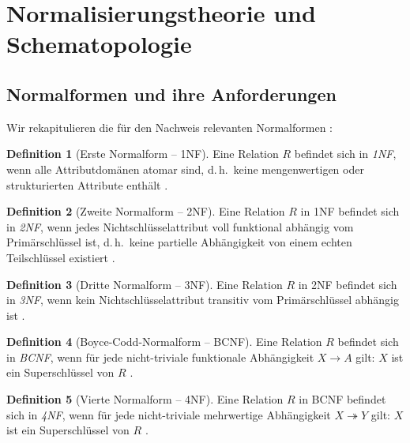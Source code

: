 ﻿\documentclass[a4paper,12pt]{report}
\theoremstyle{definition}
\newtheorem{definition}{Definition}[chapter]
\theoremstyle{remark}
\begin{document}
\section{Normalisierungstheorie und Schematopologie}
\label{sec:normalformen}

\subsection{Normalformen und ihre Anforderungen}

Wir rekapitulieren die für den Nachweis relevanten Normalformen \cite{Codd1974, Fagin1977}:

\begin{definition}[Erste Normalform -- 1NF]
Eine Relation $R$ befindet sich in \emph{1NF}, wenn alle Attributdomänen
atomar sind, d.\,h.\ keine mengenwertigen oder strukturierten Attribute
enthält \cite{Codd1970}.
\end{definition}

\begin{definition}[Zweite Normalform -- 2NF]
Eine Relation $R$ in 1NF befindet sich in \emph{2NF}, wenn jedes
Nichtschlüsselattribut voll funktional abhängig vom Primärschlüssel ist,
d.\,h.\ keine partielle Abhängigkeit von einem echten Teilschlüssel existiert
\cite{Codd1974}.
\end{definition}

\begin{definition}[Dritte Normalform -- 3NF]
Eine Relation $R$ in 2NF befindet sich in \emph{3NF}, wenn kein
Nichtschlüsselattribut transitiv vom Primärschlüssel abhängig ist
\cite{Codd1974}.
\end{definition}

\begin{definition}[Boyce-Codd-Normalform -- BCNF]
Eine Relation $R$ befindet sich in \emph{BCNF}, wenn für jede
nicht-triviale funktionale Abhängigkeit $X \to A$ gilt: $X$ ist ein
Superschlüssel von $R$ \cite{Boyce1974}.
\end{definition}

\begin{definition}[Vierte Normalform -- 4NF]
Eine Relation $R$ in BCNF befindet sich in \emph{4NF}, wenn für jede
nicht-triviale mehrwertige Abhängigkeit $X \twoheadrightarrow Y$ gilt:
$X$ ist ein Superschlüssel von $R$ \cite{Fagin1977}.
\end{definition}
\end{document}
